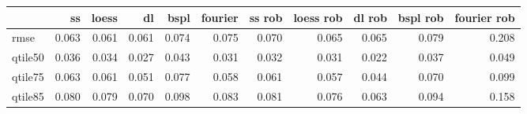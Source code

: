 \begin{tabular}{lrrrrrrrrrr}
\toprule
 & ss & loess & dl & bspl & fourier & ss rob & loess rob & dl rob & bspl rob & fourier rob \\
\midrule
rmse & {\cellcolor[HTML]{EEEEEE}} \color[HTML]{000000} 0.063 & {\cellcolor[HTML]{F1F1F1}} \color[HTML]{000000} 0.061 & {\cellcolor[HTML]{F1F1F1}} \color[HTML]{000000} 0.061 & {\cellcolor[HTML]{DCDCDC}} \color[HTML]{000000} 0.074 & {\cellcolor[HTML]{DADADA}} \color[HTML]{000000} 0.075 & {\cellcolor[HTML]{E2E2E2}} \color[HTML]{000000} 0.070 & {\cellcolor[HTML]{EBEBEB}} \color[HTML]{000000} 0.065 & {\cellcolor[HTML]{EBEBEB}} \color[HTML]{000000} 0.065 & {\cellcolor[HTML]{D3D3D3}} \color[HTML]{000000} 0.079 & {\cellcolor[HTML]{000000}} \color[HTML]{F1F1F1} 0.208 \\
qtile50 & {\cellcolor[HTML]{747474}} \color[HTML]{F1F1F1} 0.036 & {\cellcolor[HTML]{868686}} \color[HTML]{F1F1F1} 0.034 & {\cellcolor[HTML]{C4C4C4}} \color[HTML]{000000} 0.027 & {\cellcolor[HTML]{353535}} \color[HTML]{F1F1F1} 0.043 & {\cellcolor[HTML]{A0A0A0}} \color[HTML]{F1F1F1} 0.031 & {\cellcolor[HTML]{989898}} \color[HTML]{F1F1F1} 0.032 & {\cellcolor[HTML]{A0A0A0}} \color[HTML]{F1F1F1} 0.031 & {\cellcolor[HTML]{F1F1F1}} \color[HTML]{000000} 0.022 & {\cellcolor[HTML]{6B6B6B}} \color[HTML]{F1F1F1} 0.037 & {\cellcolor[HTML]{000000}} \color[HTML]{F1F1F1} 0.049 \\
qtile75 & {\cellcolor[HTML]{9E9E9E}} \color[HTML]{F1F1F1} 0.063 & {\cellcolor[HTML]{A6A6A6}} \color[HTML]{F1F1F1} 0.061 & {\cellcolor[HTML]{D2D2D2}} \color[HTML]{000000} 0.051 & {\cellcolor[HTML]{606060}} \color[HTML]{F1F1F1} 0.077 & {\cellcolor[HTML]{B3B3B3}} \color[HTML]{000000} 0.058 & {\cellcolor[HTML]{A6A6A6}} \color[HTML]{F1F1F1} 0.061 & {\cellcolor[HTML]{B8B8B8}} \color[HTML]{000000} 0.057 & {\cellcolor[HTML]{F1F1F1}} \color[HTML]{000000} 0.044 & {\cellcolor[HTML]{7E7E7E}} \color[HTML]{F1F1F1} 0.070 & {\cellcolor[HTML]{000000}} \color[HTML]{F1F1F1} 0.099 \\
qtile85 & {\cellcolor[HTML]{C6C6C6}} \color[HTML]{000000} 0.080 & {\cellcolor[HTML]{C8C8C8}} \color[HTML]{000000} 0.079 & {\cellcolor[HTML]{E0E0E0}} \color[HTML]{000000} 0.070 & {\cellcolor[HTML]{989898}} \color[HTML]{F1F1F1} 0.098 & {\cellcolor[HTML]{BFBFBF}} \color[HTML]{000000} 0.083 & {\cellcolor[HTML]{C3C3C3}} \color[HTML]{000000} 0.081 & {\cellcolor[HTML]{D0D0D0}} \color[HTML]{000000} 0.076 & {\cellcolor[HTML]{F1F1F1}} \color[HTML]{000000} 0.063 & {\cellcolor[HTML]{A2A2A2}} \color[HTML]{F1F1F1} 0.094 & {\cellcolor[HTML]{000000}} \color[HTML]{F1F1F1} 0.158 \\

\end{tabular}
